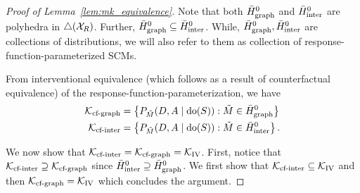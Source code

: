 \begin{proof}[Proof of Lemma~\ref{lem:mk_equivalence}]
Note that both $\bar{H}^0_{\text{graph}}$ and $\bar{H}^0_{\text{inter}}$ are polyhedra in $\triangle{\left({{\cal X}_{R}}\right)}$. Further, $\bar{H}^0_{\text{graph}} \subseteq \bar{H}^0_{\text{inter}}$. While, $\bar{H}^0_{\text{graph}}, \bar{H}^0_{\text{inter}}$ are collections of distributions, we will also refer to them as collection of response-function-parameterized SCMs. 

From interventional equivalence (which follows as a result of counterfactual equivalence) of the response-function-parameterization, we have 
\begin{align*}
    {\cal K}_{\text{cf-graph}} &= \left \lbrace P_{\tilde{M}}{\left({D,A\mid \text{do}(S)}\right)} : \tilde{M} \in \bar{H}^0_{\text{graph}} \right \rbrace \\
    {\cal K}_{\text{cf-inter}} &= \left \lbrace P_{\tilde{M}}{\left({D,A\mid \text{do}(S)}\right)} : \tilde{M} \in \bar{H}^0_{\text{inter}} \right \rbrace.
\end{align*}


We now show that ${\cal K}_{\text{cf-inter}} = {\cal K}_{\text{cf-graph}} = \mathcal{K}_{\text{IV}}$. First, notice that ${\cal K}_{\text{cf-inter}} \supseteq {\cal K}_{\text{cf-graph}}$ since $\bar{H}^0_{\text{inter}} \supseteq \bar{H}^0_{\text{graph}}$. We first show that ${\cal K}_{\text{cf-inter}} \subseteq \mathcal{K}_{\text{IV}}$ and then ${\cal K}_{\text{cf-graph}} = \mathcal{K}_{\text{IV}}$ which concludes the argument. 


\end{proof}

